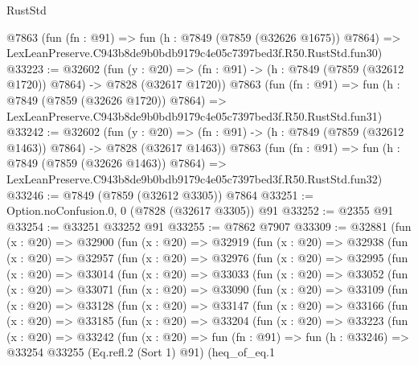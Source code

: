 \begin{lexlean}{RustStd}
\begin{coremodule}
    @7863
    (fun (fn : @91) =>
    fun (h : @7849 (@7859 (@32626 @1675)) @7864) =>
    LexLeanPreserve.C943b8de9b0bdb9179c4e05c7397bed3f.R50.RustStd.fun30)
@33223 := @32602
    (fun (y : @20) =>
    (fn : @91) -> (h : @7849 (@7859 (@32612 @1720)) @7864) -> @7828 (@32617 @1720))
    @7863
    (fun (fn : @91) =>
    fun (h : @7849 (@7859 (@32626 @1720)) @7864) =>
    LexLeanPreserve.C943b8de9b0bdb9179c4e05c7397bed3f.R50.RustStd.fun31)
@33242 := @32602
    (fun (y : @20) =>
    (fn : @91) -> (h : @7849 (@7859 (@32612 @1463)) @7864) -> @7828 (@32617 @1463))
    @7863
    (fun (fn : @91) =>
    fun (h : @7849 (@7859 (@32626 @1463)) @7864) =>
    LexLeanPreserve.C943b8de9b0bdb9179c4e05c7397bed3f.R50.RustStd.fun32)
@33246 := @7849 (@7859 (@32612 @3305)) @7864
@33251 := Option.noConfusion.{0, 0} (@7828 (@32617 @3305)) @91
@33252 := @2355 @91
@33254 := @33251 @33252 @91
@33255 := @7862 @7907
@33309 := @32881
    (fun (x : @20) =>
    @32900
      (fun (x : @20) =>
      @32919
        (fun (x : @20) =>
        @32938
          (fun (x : @20) =>
          @32957
            (fun (x : @20) =>
            @32976
              (fun (x : @20) =>
              @32995
                (fun (x : @20) =>
                @33014
                  (fun (x : @20) =>
                  @33033
                    (fun (x : @20) =>
                    @33052
                      (fun (x : @20) =>
                      @33071
                        (fun (x : @20) =>
                        @33090
                          (fun (x : @20) =>
                          @33109
                            (fun (x : @20) =>
                            @33128
                              (fun (x : @20) =>
                              @33147
                                (fun (x : @20) =>
                                @33166
                                  (fun (x : @20) =>
                                  @33185
                                    (fun (x : @20) =>
                                    @33204
                                      (fun (x : @20) =>
                                      @33223
                                        (fun (x : @20) =>
                                        @33242
                                          (fun (x : @20) =>
                                          fun (fn : @91) =>
                                          fun (h : @33246) =>
                                          @33254
                                            @33255
                                            (Eq.refl.{2} (Sort 1) @91)
                                            (heq_of_eq.{1}

\end{coremodule}
\end{lexlean}
